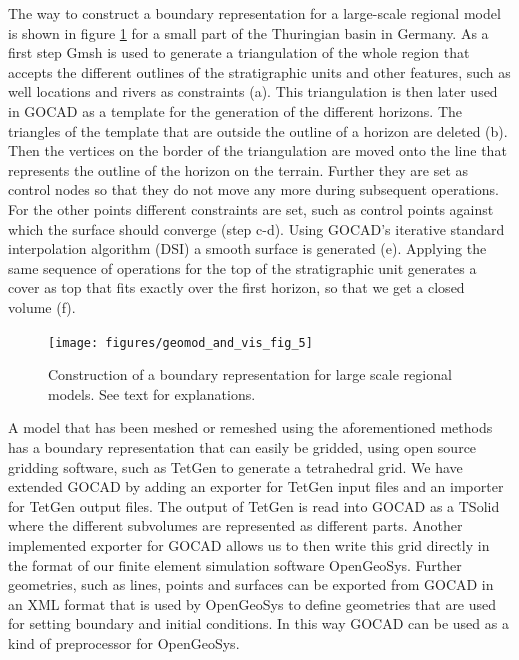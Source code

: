 The way to construct a boundary representation for a large-scale regional model is shown in figure \ref{geomod_and_vis:5} for a small part of the Thuringian basin in Germany. As a first step Gmsh is used to generate a triangulation of the whole region that accepts the different outlines of the stratigraphic units and other features, such as well locations and rivers as constraints (a). This triangulation is then later used in GOCAD as a template for the generation of the different horizons. The triangles of the template that are outside the outline of a horizon are deleted (b). Then the vertices on the border of the triangulation are moved onto the line that represents the outline of the horizon on the terrain. Further they are set as control nodes so that they do not move any more during subsequent operations. For the other points different constraints are set, such as control points against which the surface should converge (step c-d).  Using GOCAD's iterative standard interpolation algorithm (DSI) a smooth surface is generated (e). Applying the same sequence of operations for the top of the stratigraphic unit generates a cover as top that fits exactly over the first horizon, so that we get a closed volume (f).

\begin{figure}[tb]
\begin{center}
\texttt{[image: figures/geomod\_and\_vis\_fig\_5]}
\caption{Construction of a boundary representation for large scale regional models. See text for explanations.}
\label{geomod_and_vis:5}
\end{center}
\end{figure}

A model that has been meshed or remeshed using the aforementioned methods has a boundary representation that can easily be gridded, using open source gridding software, such as TetGen to generate a tetrahedral grid. We have extended GOCAD by adding an exporter for TetGen input files and an importer for TetGen output files. The output of TetGen is read into GOCAD as a TSolid where the different subvolumes are represented as different parts. Another implemented exporter for GOCAD allows us to then write this grid directly in the format of our finite element simulation software OpenGeoSys. Further geometries, such as lines, points and surfaces can be exported from GOCAD in an XML format that is used by OpenGeoSys to define geometries that are used for setting boundary and initial conditions. In this way GOCAD can be used as a kind of preprocessor for OpenGeoSys.

